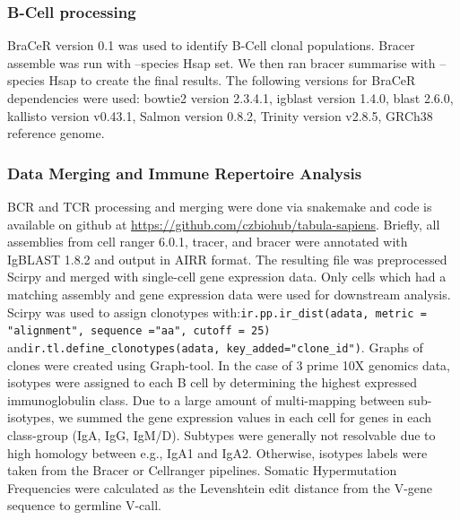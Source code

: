 \subsubsection{B-Cell processing}
BraCeR\cite{lindeman2018bracer} version 0.1 was used to identify B-Cell clonal
populations. Bracer assemble was run with --species Hsap set. We then ran bracer summarise
with --species Hsap to create the final results. The following versions for BraCeR dependencies
were used: bowtie2 version 2.3.4.1, igblast version 1.4.0, blast 2.6.0, kallisto version v0.43.1,
Salmon version 0.8.2, Trinity version v2.8.5, GRCh38 reference genome.
\subsubsection{Data Merging and Immune Repertoire Analysis}
BCR and TCR processing and merging were done via snakemake\cite{koster2012snakemake} and code is available on
github at \url{https://github.com/czbiohub/tabula-sapiens}. Briefly, all assemblies from cell ranger 6.0.1, tracer, and bracer were
annotated with IgBLAST 1.8.2\cite{ye_igblast_2013} and output in AIRR format. The resulting file was preprocessed
Scirpy\cite{sturm_scirpy_2020} and merged with single-cell gene expression data. Only cells which had a matching
assembly and gene expression data were used for downstream analysis. Scirpy was used to
assign clonotypes with:\newline\verb|ir.pp.ir_dist(adata, metric = "alignment", sequence ="aa", cutoff = 25)| and\newline\verb|ir.tl.define_clonotypes(adata, key_added="clone_id")|. 
\newline Graphs of clones were created using Graph-tool\cite{peixoto_graph-tool_2014}. In the case of 3 prime 10X genomics data, isotypes were assigned to each B cell by determining the highest expressed immunoglobulin class. Due to a large amount of multi-mapping between sub-isotypes, we
summed the gene expression values in each cell for genes in each class-group (IgA, IgG, IgM/D).
Subtypes were generally not resolvable due to high homology between e.g., IgA1 and IgA2. Otherwise, isotypes labels were taken from the Bracer or Cellranger pipelines.
Somatic Hypermutation Frequencies were calculated as the Levenshtein edit distance from the V-gene sequence
to germline V-call.

